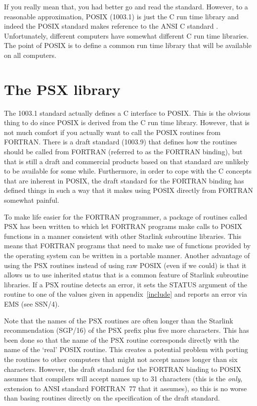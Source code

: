 \documentclass[twoside,11pt]{article}
\newcommand{\xref}[3]{#1}
\newcommand{\xlabel}[1]{}
\renewcommand{\_}{\texttt{\symbol{95}}}
\begin{document}
If you really mean that, you had better go and read the standard\cite{psx:std}.
However, to a reasonable approximation, POSIX (1003.1) is just the C run time
library and indeed the POSIX standard makes reference to the ANSI C standard
\cite{c:std}. Unfortunately, different computers have somewhat different C
run time libraries. The point of POSIX is to define a common run time library
that will be available on all computers. 

\section{\xlabel{the_psx_library}The PSX library}

The 1003.1 standard actually defines a C interface to POSIX. This is
the obvious thing to do since POSIX is derived from the C run time
library. However, that is not much comfort if you actually want to call
the POSIX routines from FORTRAN. There is a draft standard (1003.9)
that defines how the routines should be called from FORTRAN (referred
to as the FORTRAN binding), but that is still a draft and commercial
products based on that standard are unlikely to be available for some
while. Furthermore, in order to cope with the C concepts that are
inherent in POSIX, the draft standard for the FORTRAN binding has
defined things in such a way that it makes using POSIX directly from
FORTRAN somewhat painful.

To make life easier for the FORTRAN programmer, a package of routines
called PSX has been written to which let FORTRAN programs make calls to
POSIX functions in a manner consistent with other Starlink subroutine
libraries. This means that FORTRAN programs that need to make use of
functions provided by the operating system can be written in a portable
manner. Another advantage of using the PSX routines instead of using
raw POSIX (even if we could) is that it allows us to use inherited
status that is a common feature of Starlink subroutine libraries. If a
PSX routine detects an error, it sets the STATUS argument of the
routine to one of the values given in appendix~\ref{include} and
reports an error via EMS (see \xref{SSN/4}{ssn4}{}).

Note that the names of the PSX routines are often longer than the
Starlink recommendation (\xref{SGP/16}{sgp16}{}) of the PSX\_ prefix
plus five more characters. This has been done so that the name of the
PSX routine corresponds directly with the name of the `real' POSIX
routine. This creates a potential problem with porting the routines to
other computers that might not accept names longer than six characters.
However, the draft standard for the FORTRAN binding to POSIX assumes
that compilers will accept names up to 31 characters (this is the
\emph{only}, extension to ANSI standard FORTRAN~77 that it assumes), so
this is no worse than basing routines directly on the specification of
the draft standard.
\end{document}
